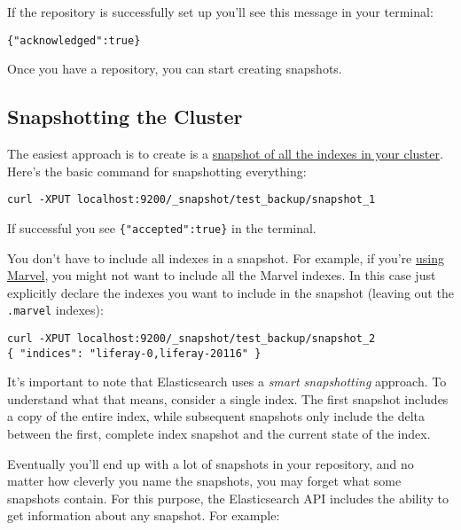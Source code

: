 If the repository is successfully set up you'll see this message in your
terminal:

\begin{verbatim}
{"acknowledged":true}
\end{verbatim}

Once you have a repository, you can start creating snapshots.

\subsection{Snapshotting the Cluster}\label{snapshotting-the-cluster}

The easiest approach is to create is a
\href{https://www.elastic.co/guide/en/elasticsearch/guide/current/backing-up-your-cluster.html\#_snapshotting_all_open_indices}{snapshot
of all the indexes in your cluster}. Here's the basic command for
snapshotting everything:

\begin{verbatim}
curl -XPUT localhost:9200/_snapshot/test_backup/snapshot_1
\end{verbatim}

If successful you see \texttt{\{"accepted":true\}} in the terminal.

You don't have to include all indexes in a snapshot. For example, if
you're
\href{/deploy/-/official_documentation/deployment/monitoring-elasticsearch-with-marvel}{using
Marvel}, you might not want to include all the Marvel indexes. In this
case just explicitly declare the indexes you want to include in the
snapshot (leaving out the \texttt{.marvel} indexes):

\begin{verbatim}
curl -XPUT localhost:9200/_snapshot/test_backup/snapshot_2
{ "indices": "liferay-0,liferay-20116" }
\end{verbatim}

It's important to note that Elasticsearch uses a \emph{smart
snapshotting} approach. To understand what that means, consider a single
index. The first snapshot includes a copy of the entire index, while
subsequent snapshots only include the delta between the first, complete
index snapshot and the current state of the index.

Eventually you'll end up with a lot of snapshots in your repository, and
no matter how cleverly you name the snapshots, you may forget what some
snapshots contain. For this purpose, the Elasticsearch API includes the
ability to get information about any snapshot. For example:

